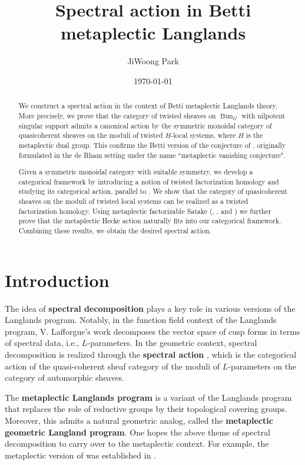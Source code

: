 \documentclass[10pt]{amsart}
\title{Spectral action in Betti metaplectic Langlands}
\author{JiWoong Park}
\theoremstyle{remark}
\newcommand{\on}{\operatorname}
\newcommand{\Bun}{\on{Bun}}
\begin{document}
\date{\today}

\begin{abstract}
We construct a spectral action in the context of Betti metaplectic Langlands theory. More precisely, we prove that the category of twisted sheaves on $\Bun_G$ with nilpotent singular support admits a canonical action by the symmetric monoidal category of quasicoherent sheaves on the moduli of twisted $H$-local systems, where $H$ is the metaplectic dual group. This confirms the Betti version of the conjecture of \cite{GL}, originally formulated in the de Rham setting under the name ``metaplectic vanishing conjecture".  

Given a symmetric monoidal category with suitable symmetry, we develop a categorical framework by introducing a notion of twisted factorization homology and studying its categorical action, parallel to \cite{GKRV}. We show that the category of quasicoherent sheaves on the moduli of twisted local systems can be realized as a twisted factorization homology. Using metaplectic factorizable Satake (\cite{Rei}, \cite{GL}, and \cite{ZhaoNew}) we further prove that the metaplectic Hecke action naturally fits into our categorical framework. Combining these results, we obtain the desired spectral action.
\end{abstract}

 

\maketitle
\tableofcontents

\section{Introduction}
The idea of \textbf{spectral decomposition} plays a key role in various versions of the Langlands program. Notably, in the function field context of the Langlands program, V. Lafforgue’s work \cite{Laf} decomposes the vector space of cusp forms in terms of spectral data, i.e., $L$-parameters. In the geometric context, spectral decomposition is realized through the \textbf{spectral action} \cite{Gai1, NY, GKRV, AGKRRV}, which is the categorical action of the quasi-coherent sheaf category of the moduli of $L$-parameters on the category of automorphic sheaves.
\medskip

The \textbf{metaplectic Langlands program} \cite{GGW, Wei, GG} is a variant of the Langlands program that replaces the role of reductive groups by their topological covering groups. Moreover, this admits a natural geometric analog, called the \textbf{metaplectic geometric Langland program}. One hopes the above theme of spectral decomposition to carry over to the metaplectic context. For example, the metaplectic version of \cite{Laf} was established in \cite{ZhaoNew}. 
\medskip
\end{document}
